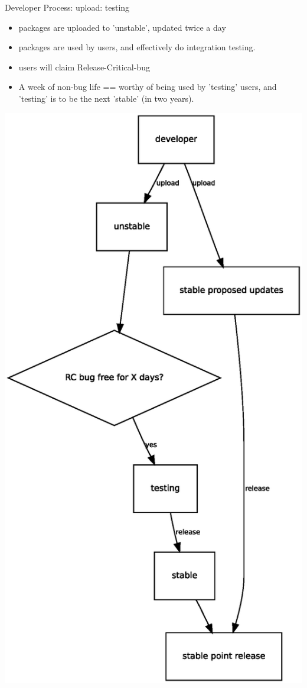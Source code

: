 \documentclass[cjk,dvipdfmx,12pt]{beamer}
\begin{document}
\begin{frame}{Developer Process: upload: testing}

\begin{minipage}{0.5\hsize}
  \begin{itemize}
   \item packages are uploaded to 'unstable', updated twice a day
   \item packages are used by users, and effectively do integration testing.
   \item users will claim Release-Critical-bug
   \item A week of non-bug life == worthy of being used by 'testing'
	 users, and 'testing' is to be the next 'stable' (in two years).
 \end{itemize}
\end{minipage}
\begin{minipage}{0.4\hsize}
 \includegraphics[width=1\hsize]{image200805/testingcycle.eps}

\end{minipage}
\end{frame}
\end{document}
